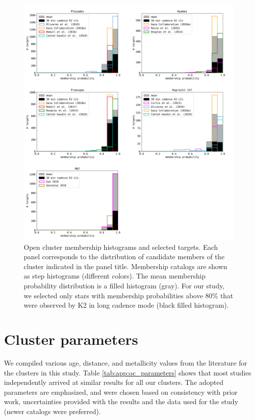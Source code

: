 \documentclass{aa}
\begin{document}
\begin{appendix}
   \begin{figure}[ht!]
            \includegraphics[width=\hsize]{pics/appendix/membership_histograms.png}
         \caption{Open cluster membership histograms and selected targets. Each panel corresponds to the distribution of candidate members of the cluster indicated in the panel title. Membership catalogs are shown as step histograms (different colors). The mean membership probability distribution is a filled histogram (gray). For our study, we selected only stars with membership probabilities above 80\% that were observed by K2 in long cadence mode (black filled histogram).}
          \label{fig:app:memberships}

   \end{figure}

\section{Cluster parameters}
\label{app:cluster_params}
We compiled various age, distance, and metallicity values from the literature for the clusters in this study. Table \ref{tab:app:oc_parameters} shows that most studies independently arrived at similar results for all our clusters. The adopted parameters are emphasized, and were chosen based on consistency with prior work, uncertainties provided with the results and the data used for the study (newer catalogs were preferred). 


\end{appendix}
\end{document}

